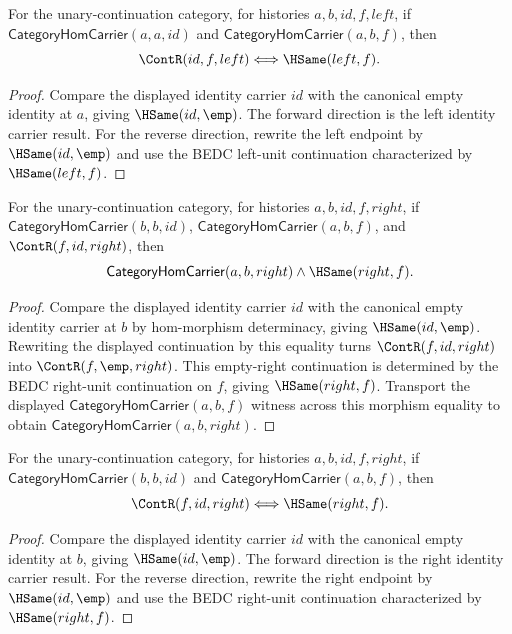 \begin{theorem}
\label{thm:category-hom-carrier-left-identity-result-iff}
For the unary-continuation category, for histories $a,b,id,f,left$, if
$\mathsf{CategoryHomCarrier}(a,a,id)$ and
$\mathsf{CategoryHomCarrier}(a,b,f)$, then
$$
\ContR(id,f,left)\Longleftrightarrow\HSame(left,f).
$$
\end{theorem}
\begin{proof}
Compare the displayed identity carrier $id$ with the canonical empty identity
at $a$, giving $\HSame(id,\emp)$. The forward direction is the left identity
carrier result. For the reverse direction, rewrite the left endpoint by
$\HSame(id,\emp)$ and use the BEDC left-unit continuation characterized by
$\HSame(left,f)$.
\end{proof}

\begin{theorem}
\label{thm:category-hom-carrier-right-identity-carrier-result}
For the unary-continuation category, for histories $a,b,id,f,right$, if
$\mathsf{CategoryHomCarrier}(b,b,id)$,
$\mathsf{CategoryHomCarrier}(a,b,f)$, and $\ContR(f,id,right)$, then
$$
\mathsf{CategoryHomCarrier}(a,b,right)\wedge\HSame(right,f).
$$
\end{theorem}
\begin{proof}
Compare the displayed identity carrier $id$ with the canonical empty identity
carrier at $b$ by hom-morphism determinacy, giving $\HSame(id,\emp)$.
Rewriting the displayed continuation by this equality turns
$\ContR(f,id,right)$ into $\ContR(f,\emp,right)$. This empty-right
continuation is determined by the BEDC right-unit continuation on $f$, giving
$\HSame(right,f)$. Transport the displayed
$\mathsf{CategoryHomCarrier}(a,b,f)$ witness across this morphism equality to
obtain $\mathsf{CategoryHomCarrier}(a,b,right)$.
\end{proof}

\begin{theorem}
\label{thm:category-hom-carrier-right-identity-result-iff}
For the unary-continuation category, for histories $a,b,id,f,right$, if
$\mathsf{CategoryHomCarrier}(b,b,id)$ and
$\mathsf{CategoryHomCarrier}(a,b,f)$, then
$$
\ContR(f,id,right)\Longleftrightarrow\HSame(right,f).
$$
\end{theorem}
\begin{proof}
Compare the displayed identity carrier $id$ with the canonical empty identity
at $b$, giving $\HSame(id,\emp)$. The forward direction is the right identity
carrier result. For the reverse direction, rewrite the right endpoint by
$\HSame(id,\emp)$ and use the BEDC right-unit continuation characterized by
$\HSame(right,f)$.
\end{proof}

